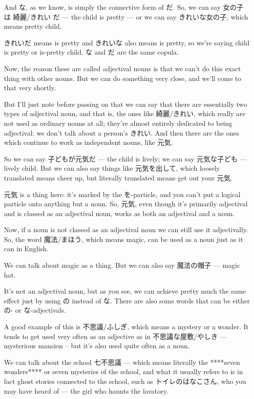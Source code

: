 And な, as we know, is simply the connective form of だ. So, we can say 女の子は 綺麗/きれい だ --- the child is pretty --- or we can say きれいな女の子, which means pretty child.

きれいだ means is pretty and きれいな also means is pretty, so we're saying child is pretty or is-pretty child. な and だ are the same copula.

Now, the reason these are called adjectival nouns is that we can't do this exact thing with other nouns. But we can do something very close, and we'll come to that very shortly.

But I'll just note before passing on that we can say that there are essentially two types of adjectival noun, and that is, the ones like 綺麗/きれい, which really are not used as ordinary nouns at all; they're almost entirely dedicated to being adjectival: we don't talk about a person's きれい. And then there are the ones which continue to work as independent nouns, like 元気.

So we can say 子どもが元気だ --- the child is lively; we can say 元気な子ども --- lively child. But we can also say things like 元気を出して, which loosely translated means cheer up, but literally translated means get out your 元気.

元気 is a thing here: it's marked by the を-particle, and you can't put a logical particle onto anything but a noun. So, 元気, even though it's primarily adjectival and is classed as an adjectival noun, works as both an adjectival and a noun.

Now, if a noun is not classed as an adjectival noun we can still use it adjectivally. So, the word 魔法/まほう, which means magic, can be used as a noun just as it can in English.

We can talk about magic as a thing. But we can also say 魔法の帽子 --- magic hat.

It's not an adjectival noun, but as you see, we can achieve pretty much the same effect just by using の instead of な. There are also some words that can be either の- or な-adjectivals.

A good example of this is 不思議/ふしぎ, which means a mystery or a wonder. It tends to get used very often as an adjective as in 不思議な屋敷/やしき --- mysterious mansion -- but it's also used quite often as a noun.

We can talk about the school 七不思議 --- which means literally the ****seven wonders**** or seven mysteries of the school, and what it usually refers to is in fact ghost stories connected to the school, such as トイレのはなこさん, who you may have heard of --- the girl who haunts the lavatory.

